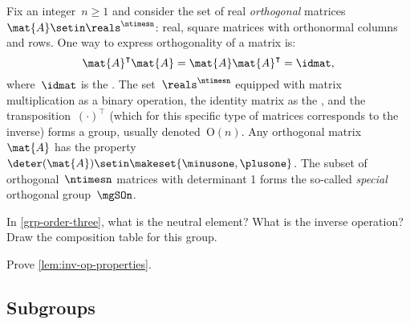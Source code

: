 \begin{example}

    Fix an integer~$n\geq 1$ and consider the set of real \emph{orthogonal} matrices~$\mat{A}\setin \reals^{\ntimesn}$:
    real, square matrices with orthonormal columns and rows.
    One way to express orthogonality of a matrix is:
    \begin{equation}
        \mat{A}^\intercal \mat{A}=\mat{A}\mat{A}^\intercal = \idmat,
    \end{equation}
    where~$\idmat$ is the .
    The set~$\reals^{\ntimesn}$ equipped with matrix multiplication as a binary operation, the identity matrix as the , and the transposition~$(\cdot)^\intercal$ (which for this specific type of matrices corresponds to the inverse) forms a group, usually denoted~$\text{O}(n)$.
    Any orthogonal matrix~$\mat{A}$ has the property~$\deter(\mat{A})\setin \makeset{\minusone,\plusone}$.
    The subset of orthogonal~$\ntimesn$ matrices with determinant 1 forms the so-called \emph{special} orthogonal group~$\mgSOn$.
\end{example}

\vfill%

\begin{gradedexercise}
    \label{ex:GroupWithThreeElements}
    In \cref{grp-order-three}, what is the neutral element?
    What is the inverse operation?
    Draw the composition table for this group.
\end{gradedexercise}


\begin{gradedexercise}
    \label{ex:GroupInverseProperties}
    Prove \cref{lem:inv-op-properties}.
\end{gradedexercise}


\subsection{Subgroups}


